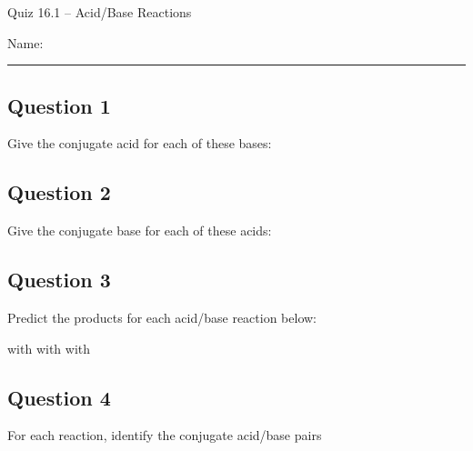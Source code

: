 \documentclass[11pt, letterpaper]{memoir}
\begin{document}
	\begin{center}
		{\large	Quiz 16.1 -- Acid/Base Reactions}
	\end{center}
	{\large Name: \rule[-1mm]{4in}{.1pt} 
	
	
	\subsection*{Question 1}
	Give the conjugate acid for each of these bases:
	
	{\large {} \hspace{3em} \hspace{3em} \hspace{3em} \hspace{3em} \hspace{3em} \hspace{3em} \hspace{3em}}		
	
	\vspace{3em}
	\subsection*{Question 2}
	Give the conjugate base for each of these acids:
	
	{\large {} \hspace{3em} \hspace{3em} \hspace{3em} \hspace{3em} \hspace{3em} \hspace{3em}\hspace{3em}}
	
	\vspace{3em}
	\subsection*{Question 3}
	Predict the products for each acid/base reaction below:
	
	{\large {} with  \hspace{7em}  with  \hspace{7em}  with }
	
	\vspace{3em}
	\subsection*{Question 4}
	For each reaction, identify the conjugate acid/base pairs
	
}
\end{document}
